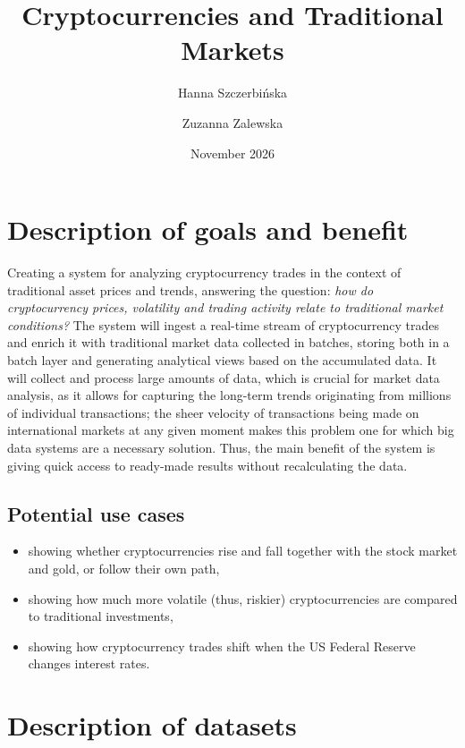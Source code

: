 \documentclass[
]{article}
\title{Cryptocurrencies and Traditional Markets}
\author{Hanna Szczerbińska \and Zuzanna Zalewska}
\date{November 2026}
\providecommand{\tightlist}{%
  \setlength{\itemsep}{0pt}\setlength{\parskip}{0pt}}
\begin{document}
\maketitle

{
\hypersetup{linkcolor=black}
\setcounter{tocdepth}{2}
\tableofcontents
\clearpage
}
\section{Description of goals and benefit}\label{description-of-goals-and-benefit}

Creating a system for analyzing cryptocurrency trades in the context of traditional asset prices and trends, answering the question: \emph{how do cryptocurrency prices, volatility and trading activity relate to traditional market conditions?} The system will ingest a real-time stream of cryptocurrency trades and enrich it with traditional market data collected in batches, storing both in a batch layer and generating analytical views based on the accumulated data. It will collect and process large amounts of data, which is crucial for market data analysis, as it allows for capturing the long-term trends originating from millions of individual transactions; the sheer velocity of transactions being made on international markets at any given moment makes this problem one for which big data systems are a necessary solution. Thus, the main benefit of the system is giving quick access to ready-made results without recalculating the data.

\subsection{Potential use cases}\label{potential-use-cases}

\begin{itemize}
\tightlist
\item
  showing whether cryptocurrencies rise and fall together with the stock market and gold, or follow their own path,
\item
  showing how much more volatile (thus, riskier) cryptocurrencies are compared to traditional investments,
\item
  showing how cryptocurrency trades shift when the US Federal Reserve changes interest rates.
\end{itemize}

\section{Description of datasets}\label{description-of-datasets}
\end{document}
